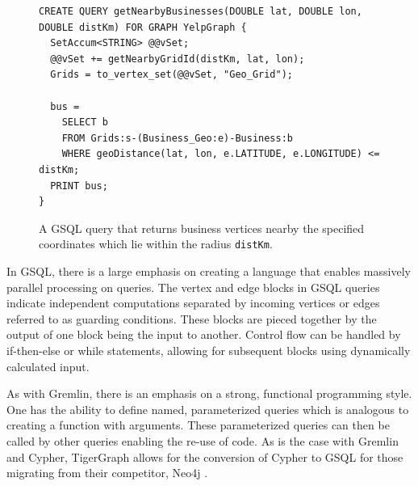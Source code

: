
\begin{figure}[h]
    \centering
    \begin{lstlisting}[language=gsql]
CREATE QUERY getNearbyBusinesses(DOUBLE lat, DOUBLE lon, DOUBLE distKm) FOR GRAPH YelpGraph {
  SetAccum<STRING> @@vSet;
  @@vSet += getNearbyGridId(distKm, lat, lon);
  Grids = to_vertex_set(@@vSet, "Geo_Grid");
	
  bus =
    SELECT b
    FROM Grids:s-(Business_Geo:e)-Business:b 
    WHERE geoDistance(lat, lon, e.LATITUDE, e.LONGITUDE) <= distKm;
  PRINT bus;
}
    \end{lstlisting}
    \caption{A GSQL query that returns business vertices nearby the specified coordinates which lie within the radius \texttt{distKm}.}
    \label{lst:gsql-accum}
\end{figure}


In GSQL, there is a large emphasis on creating a language that enables massively parallel processing on queries. The vertex and edge blocks in GSQL queries indicate independent computations separated by incoming vertices or edges referred to as guarding conditions. These blocks are pieced together by the output of one block being the input to another. Control flow can be handled by if-then-else or while statements, allowing for subsequent blocks using dynamically calculated input.

As with Gremlin, there is an emphasis on a strong, functional programming style. One has the ability to define named, parameterized queries which is analogous to creating a function with arguments. These parameterized queries can then be called by other queries enabling the re-use of code. As is the case with Gremlin and Cypher, TigerGraph allows for the conversion of Cypher to GSQL for those migrating from their competitor, Neo4j \cite{tigergraph-infoworld}.

